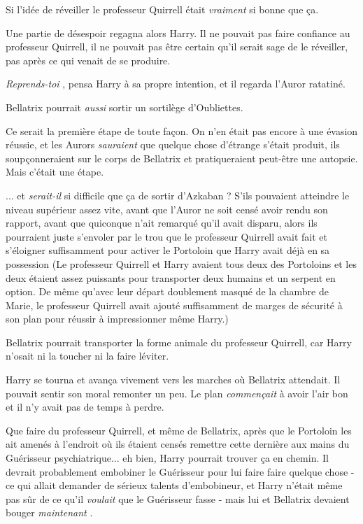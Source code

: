 Si l'idée de réveiller le professeur Quirrell était \emph{vraiment } si bonne que ça.

Une partie de désespoir regagna alors Harry. Il ne pouvait pas faire confiance au professeur Quirrell, il ne pouvait pas être certain qu'il serait sage de le réveiller, pas après ce qui venait de se produire.

\emph{Reprends-toi} , pensa Harry à sa propre intention, et il regarda l'Auror ratatiné.

Bellatrix pourrait \emph{aussi}  sortir un sortilège d'Oubliettes.

Ce serait la première étape de toute façon. On n'en était pas encore à une évasion réussie, et les Aurors \emph{sauraient}  que quelque chose d'étrange s'était produit, ils soupçonneraient sur le corps de Bellatrix et pratiqueraient peut-être une autopsie. Mais c'était une étape.

... et \emph{serait-il}  si difficile que ça de sortir d'Azkaban ? S'ils pouvaient atteindre le niveau supérieur assez vite, avant que l'Auror ne soit censé avoir rendu son rapport, avant que quiconque n'ait remarqué qu'il avait disparu, alors ils pourraient juste s'envoler par le trou que le professeur Quirrell avait fait et s'éloigner suffisamment pour activer le Portoloin que Harry avait déjà en sa possession (Le professeur Quirrell et Harry avaient tous deux des Portoloins et les deux étaient assez puissants pour transporter deux humains et un serpent en option. De même qu'avec leur départ doublement masqué de la chambre de Marie, le professeur Quirrell avait ajouté suffisamment de marges de sécurité à son plan pour réussir à impressionner même Harry.)

Bellatrix pourrait transporter la forme animale du professeur Quirrell, car Harry n'osait ni la toucher ni la faire léviter.

Harry se tourna et avança vivement vers les marches où Bellatrix attendait. Il pouvait sentir son moral remonter un peu. Le plan \emph{commençait}  à avoir l'air bon et il n'y avait pas de temps à perdre.

Que faire du professeur Quirrell, et même de Bellatrix, après que le Portoloin les ait amenés à l'endroit où ils étaient censés remettre cette dernière aux mains du Guérisseur psychiatrique... eh bien, Harry pourrait trouver ça en chemin. Il devrait probablement embobiner le Guérisseur pour lui faire faire quelque chose - ce qui allait demander de sérieux talents d'embobineur, et Harry n'était même pas sûr de ce qu'il \emph{voulait}  que le Guérisseur fasse - mais lui et Bellatrix devaient bouger \emph{maintenant} .

